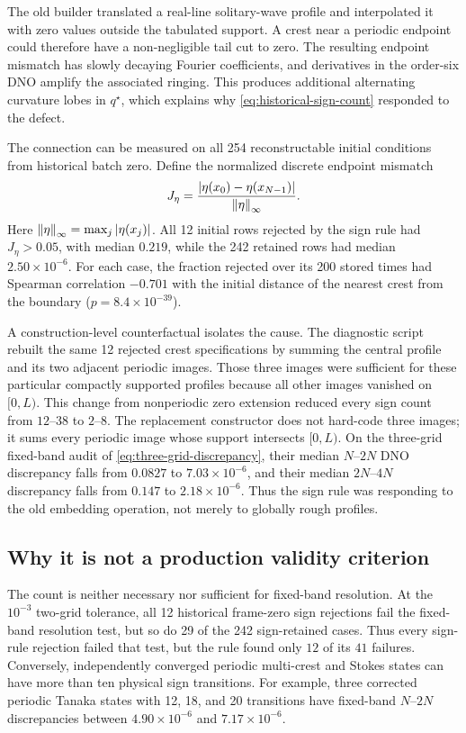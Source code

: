 The old builder translated a real-line solitary-wave profile and interpolated
it with zero values outside the tabulated support.  A crest near a periodic
endpoint could therefore have a non-negligible tail cut to zero.  The resulting
endpoint mismatch has slowly decaying Fourier coefficients, and derivatives in
the order-six DNO amplify the associated ringing.  This produces additional
alternating curvature lobes in $q^\star$, which explains why
\cref{eq:historical-sign-count} responded to the defect.

The connection can be measured on all 254 reconstructable initial conditions
from historical batch zero.  Define the normalized discrete endpoint mismatch
\begin{equation}
  J_\eta=
  \frac{|\eta(x_0)-\eta(x_{N-1})|}{\left\lVert \eta\right\rVert_\infty}.
  \label{eq:endpoint-mismatch}
\end{equation}
Here \(\left\lVert \eta\right\rVert_\infty=\max_j|\eta(x_j)|\).
All 12 initial rows rejected by the sign rule had $J_\eta>0.05$, with median
$0.219$, while the 242 retained rows had median $2.50\times10^{-6}$.  For each
case, the fraction rejected over its 200 stored times had Spearman correlation
$-0.701$ with the initial distance of the nearest crest from the boundary
($p=8.4\times10^{-39}$).

A construction-level counterfactual isolates the cause.  The diagnostic
script rebuilt the same 12 rejected crest specifications by summing the
central profile and its two adjacent periodic images.  Those three images
were sufficient for these particular compactly supported profiles because
all other images vanished on $[0,L)$.  This change from nonperiodic zero
extension reduced every sign count from $12$--$38$ to $2$--$8$.  The
replacement constructor does not hard-code three images; it sums every
periodic image whose support intersects $[0,L)$.  On the three-grid fixed-band
audit of
\cref{eq:three-grid-discrepancy}, their median $N$--$2N$ DNO discrepancy falls
from $0.0827$ to $7.03\times10^{-6}$, and their median $2N$--$4N$ discrepancy
falls from $0.147$ to $2.18\times10^{-6}$.  Thus the sign rule was responding
to the old embedding operation, not merely to globally rough profiles.

\subsection{Why it is not a production validity criterion}

The count is neither necessary nor sufficient for fixed-band resolution.  At
the $10^{-3}$ two-grid tolerance, all 12 historical frame-zero sign
rejections fail the fixed-band resolution test, but so do 29 of the 242
sign-retained cases.  Thus every sign-rule rejection failed that test, but the
rule found only $12$ of its $41$ failures.  Conversely, independently
converged periodic multi-crest and Stokes states can have more than ten
physical sign transitions.
For example, three corrected periodic Tanaka states with 12, 18, and 20
transitions have fixed-band $N$--$2N$ discrepancies between
$4.90\times10^{-6}$ and $7.17\times10^{-6}$.

